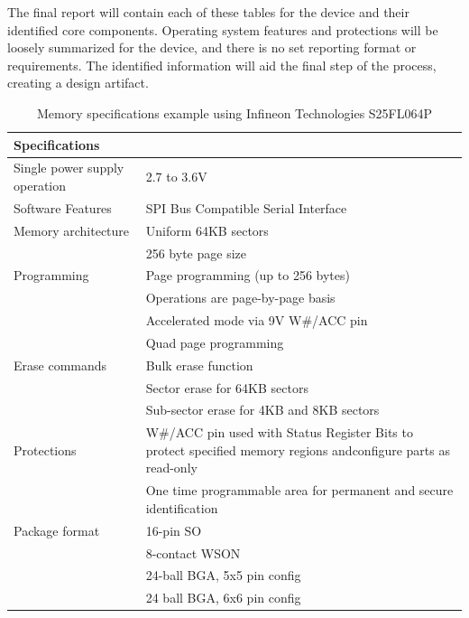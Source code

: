 The final report will contain each of these tables for the device and their identified core components. Operating system features and protections will be loosely summarized for the device,  and there is no set reporting format or requirements. The identified information will aid the final step of the process, creating a design artifact.

\begin{table}[H]
  \centering
  \begin{tabular}{|p{6cm}|p{9cm}|}
    \hline\rowcolor{gray!30}

    \textbf{Specifications} &  \\
    \hline

    Single power supply operation & 2.7 to 3.6V \\
    \hline

    Software Features & SPI Bus Compatible Serial Interface \\
    \hline

    Memory architecture & Uniform 64KB sectors \\
    & 256 byte page size \\
    \hline

    Programming & Page programming (up to 256 bytes) \\
    & Operations are page-by-page basis \\
    & Accelerated mode via 9V W\#/ACC pin \\
    & Quad page programming \\
    \hline

    Erase commands & Bulk erase function \\
     & Sector erase for 64KB sectors \\
     & Sub-sector erase for 4KB and 8KB sectors \\
    \hline

    Protections & W\#/ACC pin used with Status Register Bits to protect specified memory regions andconfigure parts as read-only \\
    & One time programmable area for permanent and secure identification \\
    \hline

    Package format & 16-pin SO \\
    & 8-contact WSON \\
    & 24-ball BGA, 5x5 pin config \\
    & 24 ball BGA, 6x6 pin config \\
    \hline

  \end{tabular}
  \caption{Memory specifications example using Infineon Technologies S25FL064P \autocite{S25FL064PSeriesFlash}}
  \label{fig:memory_specs}%
\end{table}

